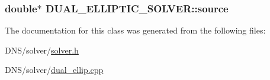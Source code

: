 \subsubsection[{\texorpdfstring{source}{source}}]{\setlength{\rightskip}{0pt plus 5cm}double$\ast$ D\+U\+A\+L\+\_\+\+E\+L\+L\+I\+P\+T\+I\+C\+\_\+\+S\+O\+L\+V\+E\+R\+::source}\hypertarget{class_d_u_a_l___e_l_l_i_p_t_i_c___s_o_l_v_e_r_a17e1d162f2a626babc280614fa8a8a01}{}\label{class_d_u_a_l___e_l_l_i_p_t_i_c___s_o_l_v_e_r_a17e1d162f2a626babc280614fa8a8a01}


The documentation for this class was generated from the following files\+:\begin{DoxyCompactItemize}
\item 
D\+N\+S/solver/\hyperlink{solver_8h}{solver.\+h}\item 
D\+N\+S/solver/\hyperlink{dual__ellip_8cpp}{dual\+\_\+ellip.\+cpp}\end{DoxyCompactItemize}
